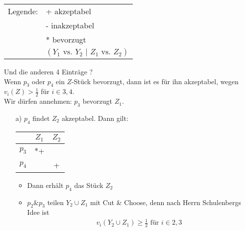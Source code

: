 \documentclass[a4paper,10pt]{scrartcl}
\begin{document}
\begin{description}
\begin{itemize}
\begin{description}
\begin{itemize}
                                               \begin{tabular}{cl}
                                                Legende: &+ akzeptabel\\
                                                &- inakzeptabel\\
                                                &* bevorzugt\\
                                                &$(Y_1\text{ vs. }Y_2\text{ | }Z_1\text{ vs. }Z_2)$
                                               \end{tabular}

                                        \end{itemize}
                                        Und die anderen 4 Einträge ?\\
                                        Wenn $p_3$ oder $p_4$ ein $Z$-Stück bevorzugt, dann ist es für ihn akzeptabel, wegen $v_i(Z)>\frac{1}{2}
                                        $ für $i\in{3,4}$.\\
                                        Wir dürfen annehmen: $p_3$ bevorzugt $Z_1$.
                                        \begin{enumerate}
                                         \item[a)] $p_4$ findet $Z_2$ akzeptabel. Dann gilt:\\
                                               \begin{tabular}{c|cc}
                                                &$Z_1$&$Z_2$\\\hline
                                                $p_3$&*+&\\
                                                $p_4$&&+
                                               \end{tabular}
                                               \begin{itemize}
                                                \item Dann erhält $p_4$ das Stück $Z_2$
                                                \item $p_2\&p_3$ teilen $Y_2\cup Z_1$ mit Cut \& Choose, denn nach Herrn Schulenbergs Idee ist
                                                      \begin{eqnarray*}
                                                       v_i(Y_2\cup Z_1)\geq\frac{1}{2}\text{ für }i\in{2,3}
                                                      \end{eqnarray*}

\end{itemize}
\end{enumerate}
\end{description}
\end{itemize}
\end{description}
\end{document}
